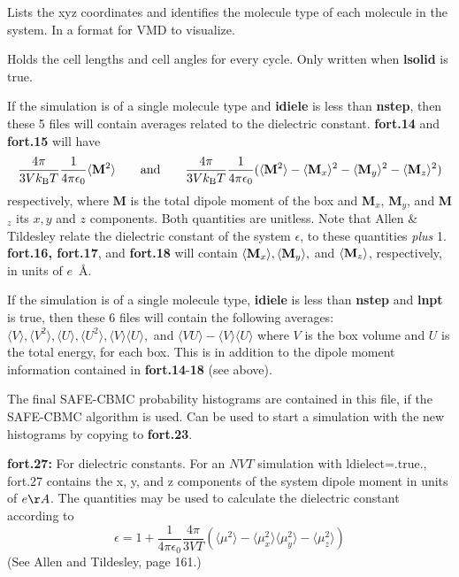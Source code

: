 \documentclass[12pt,letterpaper]{article}
\begin{document}
{{{{{{{ Lists the xyz coordinates and identifies the molecule type of each molecule
in the system.  In a format for VMD to visualize.

 Holds the cell lengths and cell angles for every cycle.  Only written when
{\bf lsolid} is true.

If the simulation is of a single molecule type and {\bf idiele} is
less than {\bf nstep}, then these 5 files will contain averages
related to the dielectric constant. {\bf fort.14} and {\bf fort.15}
will have
$$
{{4\pi} \over {3Vk_{\rm B}T}} {1 \over 4\pi\epsilon_0} 
\langle {\bf M}^2\rangle 
\hskip 20pt {\rm and} \hskip 20pt
{{4\pi} \over {3Vk_{\rm B}T} }{1 \over 4\pi\epsilon_0} 
(\langle {\bf M}^2\rangle - 
\langle {\bf M}_x\rangle^2 - 
\langle{\bf M}_y\rangle^2 - 
\langle{\bf M}_z\rangle^2 )
$$ 
respectively, where {\bf M} is the total dipole moment of the box and
{\bf M}$_x$, {\bf M}$_y$, and {\bf M}$_z$ its $x, y$ and $z$
components.  Both quantities are unitless.  Note that Allen \&
Tildesley relate the dielectric constant of the system $\epsilon$, to
these quantities {\sl plus} 1.  {\bf fort.16, fort.17}, and {\bf
fort.18} will contain $\langle{\bf M}_x\rangle, \langle{\bf
M}_y\rangle,$ and $\langle{\bf M}_z\rangle$, respectively, in units of
$e$~{\AA}.

If the simulation is of a single molecule type, {\bf idiele} is less
than {\bf nstep} and {\bf lnpt} is true, then these 6 files will
contain the following averages: $\langle V\rangle, \langle V^2
\rangle, \langle U \rangle, \langle U^2\rangle, \langle V
\rangle\langle U \rangle,$ and $\langle VU \rangle - \langle V \rangle
\langle U \rangle$ where $V$ is the box volume and $U$ is the total
energy, for each box.  This is in addition to the dipole moment
information contained in {\bf fort.14}-{\bf 18} (see above).

The final SAFE-CBMC probability histograms are contained in this file,
if the SAFE-CBMC algorithm is used.  Can be used to start a simulation
with the new histograms by copying to {\bf fort.23}.

\noindent \textbf{fort.27:} For dielectric constants.
For an $NVT$ simulation with ldielect=.true., fort.27 contains the x, y, and z components
of the system dipole moment in units of $e \AA$.  The quantities may be used to calculate the 
dielectric constant according to
\begin{equation}
\epsilon = 1 + \frac{1}{4\pi\epsilon_0} \frac{4 \pi}{3VT} \left ( \langle \mu^2 \rangle - \langle \mu_x^2 \rangle
 \langle \mu_y^2 \rangle - \langle \mu_z^2 \rangle \right )
\end{equation}
(See Allen and Tildesley, page 161.)

}}}}}}}
\end{document}

